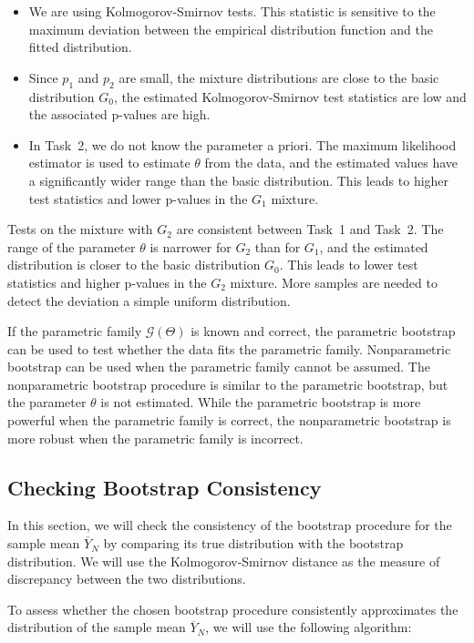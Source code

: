 \documentclass{article}
\begin{document}
\begin{itemize}
    \item We are using Kolmogorov-Smirnov tests. This statistic is sensitive to the maximum deviation between the empirical distribution function and the fitted distribution.
    \item Since \(p_1\) and \(p_2\) are small, the mixture distributions are close to the basic distribution \(G_0\), the estimated Kolmogorov-Smirnov test statistics are low and the associated p-values are high.
    \item In Task~2, we do not know the parameter a priori. The maximum likelihood estimator is used to estimate \(\theta\) from the data, and the estimated values have a significantly wider range than the basic distribution. This leads to higher test statistics and lower p-values in the \(G_1\) mixture.
\end{itemize}

Tests on the mixture with \(G_2\) are consistent between Task~1 and Task~2. The range of the parameter \(\theta\) is narrower for \(G_2\) than for \(G_1\), and the estimated distribution is closer to the basic distribution \(G_0\). This leads to lower test statistics and higher p-values in the \(G_2\) mixture. More samples are needed to detect the deviation a simple uniform distribution.


If the parametric family \(\mathcal{G}(\Theta)\) is known and correct, the parametric bootstrap can be used to test whether the data fits the parametric family. Nonparametric bootstrap can be used when the parametric family cannot be assumed. The nonparametric bootstrap procedure is similar to the parametric bootstrap, but the parameter \(\theta\) is not estimated. While the parametric bootstrap is more powerful when the parametric family is correct, the nonparametric bootstrap is more robust when the parametric family is incorrect.

\subsection{Checking Bootstrap Consistency}

In this section, we will check the consistency of the bootstrap procedure for the sample mean \(\overline{Y}_N\) by comparing its true distribution with the bootstrap distribution. We will use the Kolmogorov-Smirnov distance as the measure of discrepancy between the two distributions.

To assess whether the chosen bootstrap procedure consistently approximates the distribution of the sample mean \(\overline{Y}_N\), we will use the following algorithm:
\end{document}
